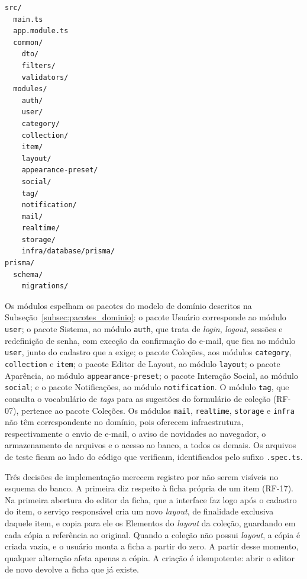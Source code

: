 \FloatBarrier
\begin{quadro}[h!]
\caption{Estrutura de diretórios do \textit{backend}}
\label{quad:estruturaBackend}
\centering
\begin{minipage}{0.6\textwidth}
\begin{lstlisting}[numbers=none]
src/
  main.ts
  app.module.ts
  common/
    dto/
    filters/
    validators/
  modules/
    auth/
    user/
    category/
    collection/
    item/
    layout/
    appearance-preset/
    social/
    tag/
    notification/
    mail/
    realtime/
    storage/
    infra/database/prisma/
prisma/
  schema/
    migrations/
\end{lstlisting}
\end{minipage}
\end{quadro}
\FloatBarrier

Os módulos espelham os pacotes do modelo de domínio descritos na Subseção~\ref{subsec:pacotes_dominio}: o pacote Usuário corresponde ao módulo \texttt{user}; o pacote Sistema, ao módulo \texttt{auth}, que trata de \textit{login}, \textit{logout}, sessões e redefinição de senha, com exceção da confirmação do e-mail, que fica no módulo \texttt{user}, junto do cadastro que a exige; o pacote Coleções, aos módulos \texttt{category}, \texttt{collection} e \texttt{item}; o pacote Editor de Layout, ao módulo \texttt{layout}; o pacote Aparência, ao módulo \texttt{appearance-preset}; o pacote Interação Social, ao módulo \texttt{social}; e o pacote Notificações, ao módulo \texttt{notification}. O módulo \texttt{tag}, que consulta o vocabulário de \textit{tags} para as sugestões do formulário de coleção (RF-07), pertence ao pacote Coleções. Os módulos \texttt{mail}, \texttt{realtime}, \texttt{storage} e \texttt{infra} não têm correspondente no domínio, pois oferecem infraestrutura, respectivamente o envio de e-mail, o aviso de novidades ao navegador, o armazenamento de arquivos e o acesso ao banco, a todos os demais. Os arquivos de teste ficam ao lado do código que verificam, identificados pelo sufixo \texttt{.spec.ts}.

Três decisões de implementação merecem registro por não serem visíveis no esquema do banco. A primeira diz respeito à ficha própria de um item (RF-17). Na primeira abertura do editor da ficha, que a interface faz logo após o cadastro do item, o serviço responsável cria um novo \textit{layout}, de finalidade exclusiva daquele item, e copia para ele os Elementos do \textit{layout} da coleção, guardando em cada cópia a referência ao original. Quando a coleção não possui \textit{layout}, a cópia é criada vazia, e o usuário monta a ficha a partir do zero. A partir desse momento, qualquer alteração afeta apenas a cópia. A criação é idempotente: abrir o editor de novo devolve a ficha que já existe.

